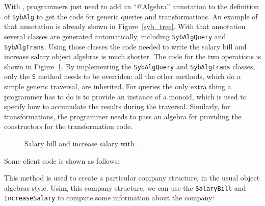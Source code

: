 With \Name, programmers just need to add an ``$@$Algebra'' annotation
to the definition of \lstinline{SybAlg} to get the code for generic
queries and transformations. An example of that annotation is already
shown in Figure~\ref{syb_tree}. With that annotation several classes
are generated automatically, including \lstinline{SybAlgQuery} and
\lstinline{SybAlgTrans}. Using those classes the code needed to write
the salary bill and increase salary object algebras is much
shorter. The code for the two operations is shown in
Figure~\ref{query_with_oaframework}. By implementing the
\lstinline{SybAlgQuery} and \lstinline{SybAlgTrans} classes, only the
\lstinline{S} method needs to be overriden: all the other methods,
which do a simple generic traversal, are inherited. For queries the
only extra thing a programmer has to do is to provide an instance of a
monoid, which is used to specify how to accumulate the results during
the traversal. Similarly, for transformations, the programmer needs to
pass an algebra for providing the constructors for the transformation
code.

\begin{figure}[tb]
\vspace{-.1in}
\caption{Salary bill and increase salary with \Name.}
\label{query_with_oaframework}
\end{figure}

Some client code is shown as follows: %


This method is used to create a particular company structure, in the
usual object algebras style. 
Using this company structure, we can use the \lstinline{SalaryBill}
and \lstinline{IncreaseSalary} to compute some information about the company:

